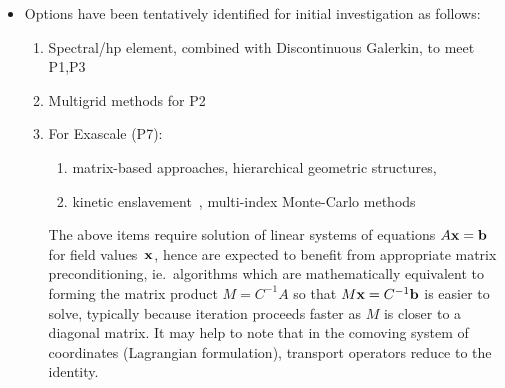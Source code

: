 \begin{itemize}
\item Options have been tentatively 
identified for initial investigation as follows:
\begin{enumerate}
\item Spectral/hp element, combined with Discontinuous Galerkin, to meet P1,P3
\item Multigrid methods for P2
\item For Exascale (P7):
\begin{enumerate}
\item matrix-based approaches, hierarchical geometric structures,
\item kinetic enslavement~\cite{taitano}, multi-index Monte-Carlo methods
\end{enumerate}
The above items require solution of linear systems of equations $A{\bf x} = {\bf b}$
for field values~${\bf x}$, hence
are expected to benefit from appropriate matrix preconditioning, ie.\
algorithms which are mathematically equivalent to forming the
matrix product $M=C^{-1}A$ so that $M{\bf x}=C^{-1}{\bf b}$ is easier to solve,
typically because iteration proceeds faster as $M$ is closer to a diagonal matrix.
It may help to note that in the comoving system of coordinates (Lagrangian formulation), 
transport operators reduce to the identity.

\end{enumerate}
\end{itemize}

